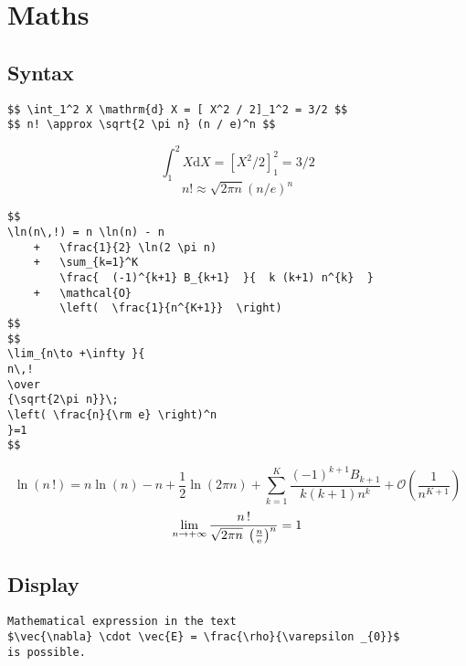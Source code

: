 \chapter{Maths}

\section{Syntax}

\begin{LaTeXsource}[Symbols]
\begin{verbatim}
$$ \int_1^2 X \mathrm{d} X = [ X^2 / 2]_1^2 = 3/2 $$
$$ n! \approx \sqrt{2 \pi n} (n / e)^n $$
\end{verbatim}
\end{LaTeXsource}

\begin{Results}
$$ \int_1^2 X \mathrm{d} X = [ X^2 / 2]_1^2 = 3/2 $$
$$ n! \approx \sqrt{2 \pi n} (n / e)^n $$
\end{Results}

\pagebreak

\begin{LaTeXsource}[Boxing]
\begin{verbatim}
$$
\ln(n\,!) = n \ln(n) - n
    +   \frac{1}{2} \ln(2 \pi n)
    +   \sum_{k=1}^K
        \frac{  (-1)^{k+1} B_{k+1}  }{  k (k+1) n^{k}  }
    +   \mathcal{O}
        \left(  \frac{1}{n^{K+1}}  \right)
$$
$$
\lim_{n\to +\infty }{
n\,!
\over
{\sqrt{2\pi n}}\;
\left( \frac{n}{\rm e} \right)^n
}=1
$$
\end{verbatim}
\end{LaTeXsource}

\begin{Results}
$$
\ln(n\,!) =
        n \ln(n) - n
    +   \frac{1}{2} \ln(2 \pi n)
    +   \sum_{k=1}^K
        \frac{ (-1)^{k+1} B_{k+1} }{ k (k+1) n^{k} }
    +   \mathcal{O}
        \left(
            \frac{1}{n^{K+1}}
        \right)
$$
$$
\lim_{n\to +\infty }{
n\,!
\over
{\sqrt{2\pi n}}\;\left(\frac{n}{\rm e} \right)^n
}=1
$$
\end{Results}

\pagebreak
\section{Display}

\begin{LaTeXsource}[Inline]
\begin{verbatim}
Mathematical expression in the text
$\vec{\nabla} \cdot \vec{E} = \frac{\rho}{\varepsilon _{0}}$
is possible.
\end{verbatim}
\end{LaTeXsource}

